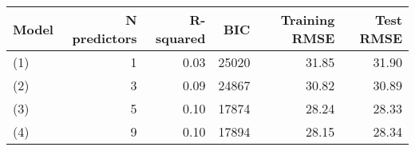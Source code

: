 \begin{tabular}{lrrrrr}
  \toprule
Model & N predictors & R-squared & BIC & Training RMSE & Test RMSE \\ 
  \midrule
(1) & 1 & 0.03 & 25020 & 31.85 & 31.90 \\ 
  (2) & 3 & 0.09 & 24867 & 30.82 & 30.89 \\ 
  (3) & 5 & 0.10 & 17874 & 28.24 & 28.33 \\ 
  (4) & 9 & 0.10 & 17894 & 28.15 & 28.34 \\ 
   \bottomrule
\end{tabular}
